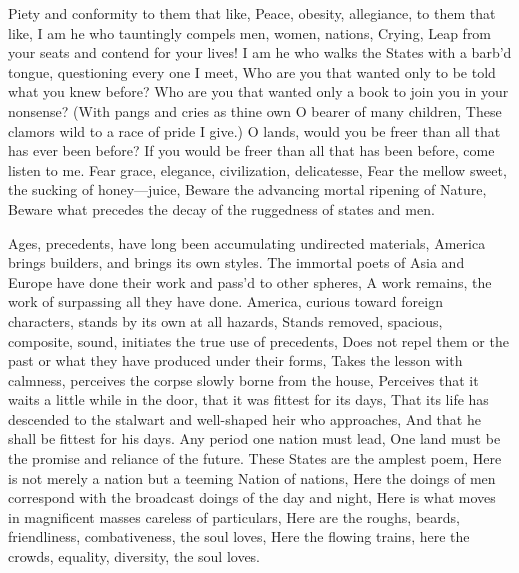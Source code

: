 \documentclass[11pt]{book}
\newenvironment {poem} [1]
 {\titulus{#1}%
  \versus
  \Nstanza{0}%
  \numerus{1}}
 {\endversus}
\begin{document}
\begin{poem}{By Blue Ontario's Shore}
Piety and conformity to them that like,
Peace, obesity, allegiance, to them that like,
I am he who tauntingly compels men, women, nations,
Crying, Leap from your seats and contend for your lives!
     \vacua
I am he who walks the States with a barb'd tongue, questioning every %
    one I meet,
Who are you that wanted only to be told what you knew before?
Who are you that wanted only a book to join you in your nonsense?
     \vacua
(With pangs and cries as thine own O bearer of many children,
These clamors wild to a race of pride I give.)
     \vacua
O lands, would you be freer than all that has ever been before?
If you would be freer than all that has been before, come listen to me.
     \vacua
Fear grace, elegance, civilization, delicatesse,
Fear the mellow sweet, the sucking of honey---juice,
Beware the advancing mortal ripening of Nature,
Beware what precedes the decay of the ruggedness of states and men.

\stropha %

Ages, precedents, have long been accumulating undirected materials,
America brings builders, and brings its own styles.
     \vacua
The immortal poets of Asia and Europe have done their work and %
    pass'd to other spheres,
A work remains, the work of surpassing all they have done.
     \vacua
America, curious toward foreign characters, stands by its own at all %
    hazards,
Stands removed, spacious, composite, sound, initiates the true use %
    of precedents,
Does not repel them or the past or what they have produced under %
    their forms,
Takes the lesson with calmness, perceives the corpse slowly borne %
    from the house,
Perceives that it waits a little while in the door, that it was %
    fittest for its days,
That its life has descended to the stalwart and well-shaped heir who %
    approaches,
And that he shall be fittest for his days.
     \vacua
Any period one nation must lead,
One land must be the promise and reliance of the future.
     \vacua
These States are the amplest poem,
Here is not merely a nation but a teeming Nation of nations,
Here the doings of men correspond with the broadcast doings of the %
    day and night,
Here is what moves in magnificent masses careless of particulars,
Here are the roughs, beards, friendliness, combativeness, the soul loves,
Here the flowing trains, here the crowds, equality, diversity, the %
    soul loves.

\stropha %


\end{poem}
\end{document}
